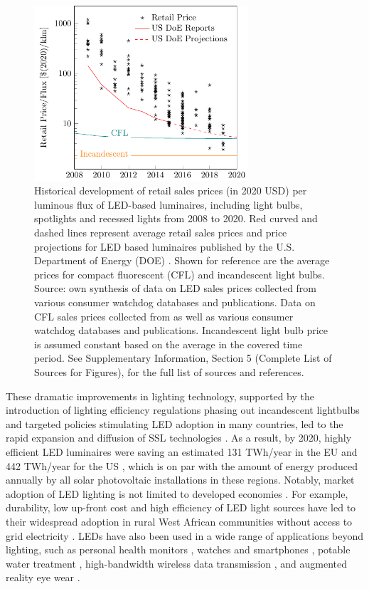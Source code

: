 \documentclass[twoside,twocolumn,9pt]{article}
\begin{document}
\begin{figure}
\centering
  \includegraphics[height=6.5cm]{2_SSL_EES/article/figures/cost_lamp_small.pdf}
  \caption{Historical development of retail sales prices (in 2020 USD) per luminous flux of LED-based luminaires, including light bulbs, spotlights and recessed lights from 2008 to 2020. Red curved and dashed lines represent average retail sales prices and price projections for LED based luminaires published by the U.S. Department of Energy (DOE) \cite{council2013assessment}. Shown for reference are the average prices for compact fluorescent (CFL) and incandescent light bulbs. Source: own synthesis of data on LED sales prices collected from various consumer watchdog databases and publications. Data on CFL sales prices collected from \cite{eger2018origin} as well as various consumer watchdog databases and publications. Incandescent light bulb price is assumed constant based on the average in the covered time period. See Supplementary Information, Section 5 (Complete List of Sources for Figures), for the full list of sources and references.}
  \label{fgr:cost_lamp_small}
\end{figure}

These  dramatic improvements in lighting technology, supported by the introduction of lighting efficiency regulations phasing out incandescent lightbulbs and targeted policies stimulating LED adoption in many countries, led to the rapid expansion and diffusion of SSL technologies  \cite{weinold2020long}\cite{Mills2014}\cite{Stegmaier2021}\cite{grubb2021new}. As a result, by 2020, highly efficient LED luminaires were saving an estimated 131 TWh/year in the EU \cite{eu2019impactass} and 442 TWh/year for the US \cite{guidehouse2020adoption}, which is on par with the amount of energy produced annually by all solar photovoltaic installations in these regions. Notably, market adoption of LED lighting is not limited to developed economies \cite{Kamat2020}. For example, durability, low up-front cost and high efficiency of LED light sources have led to their widespread adoption in rural West African communities without access to grid electricity \cite{Bensch2017}. LEDs have also been used in a wide range of applications beyond lighting, such as personal health monitors \cite{o2019optical}\cite{Wyatt2020}, watches and smartphones \cite{Bai2017}, potable water treatment \cite{Lui2014}, high-bandwidth wireless data transmission \cite{Haas2016}, and augmented reality eye wear \cite{Lee2016}. 
\end{document}
